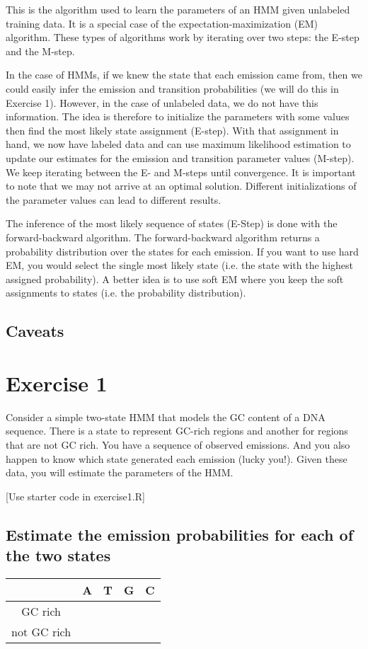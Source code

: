 \documentclass[11pt, oneside]{article}
\begin{document}
This is the algorithm used to learn the parameters of an HMM given unlabeled training data. 
It is a special case of the expectation-maximization (EM) algorithm. These types of algorithms work by iterating over two steps: the E-step and the M-step.

In the case of HMMs, if we knew the state that each emission came from, then we could easily infer the emission and transition probabilities (we will do this in Exercise 1). However, in the case of unlabeled data, we do not have this information. The idea is therefore to initialize the parameters with some values then find the most likely state assignment (E-step). With that assignment in hand, we now have labeled data and can use maximum likelihood estimation to update our estimates for the emission and transition parameter values (M-step). We keep iterating between the E- and M-steps until convergence. It is important to note that we may not arrive at an optimal solution. Different initializations of the parameter values can lead to different results.

The inference of the most likely sequence of states (E-Step) is done with the forward-backward algorithm. The forward-backward algorithm returns a probability distribution over the states for each emission. If you want to use hard EM, you would select the single most likely state (i.e. the state with the highest assigned probability). A better idea is to use soft EM where you keep the soft assignments to states (i.e. the probability distribution).

\subsection{Caveats}

\section{Exercise 1}
Consider a simple two-state HMM that models the GC content of a DNA sequence. 
There is a state to represent GC-rich regions and another for regions that are not GC rich.
You have a sequence of observed emissions. 
And you also happen to know which state generated each emission (lucky you!). 
Given these data, you will estimate the parameters of the HMM. 

[Use starter code in exercise1.R]

\subsection{Estimate the emission probabilities for each of the two states}
\begin{table}[H]
\centering
\begin{tabular}{|c|c|c|c|c|}
\hline
& A & T & G & C \\\hline
GC rich & & & &  \\\hline
not GC rich & & & & \\\hline
\end{tabular}
\end{table}
\end{document}
